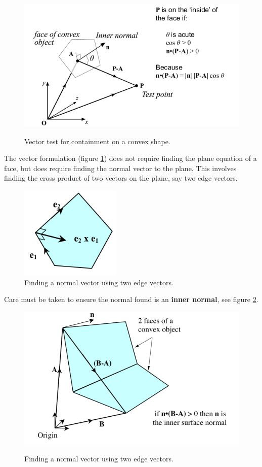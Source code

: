 \documentclass[11pt]{article}
\begin{document}
\begin{figure}[htb!]
  \caption{Vector test for containment on a convex shape.}
  \includegraphics[scale=0.5]{containmentvector}
  \label{fig:vectortest}
  \centering
\end{figure}

The vector formulation (figure \ref{fig:vectortest}) does not require finding the plane equation of a face, but does require finding the normal vector to the plane.
This involves finding the cross product of two vectors on the plane, say two edge vectors.

\begin{figure}[htb!]
  \caption{Finding a normal vector using two edge vectors.}
  \includegraphics[scale=0.5]{edgenormal}
  \centering
\end{figure}

Care must be taken to ensure the normal found is an \textbf{inner normal}, see figure \ref{fig:innernormalcheck}.

\begin{figure}[htb!]
  \caption{Finding a normal vector using two edge vectors.}
  \includegraphics[scale=0.4]{innernormal}
  \label{fig:innernormalcheck}
  \centering
\end{figure}
\end{document}
